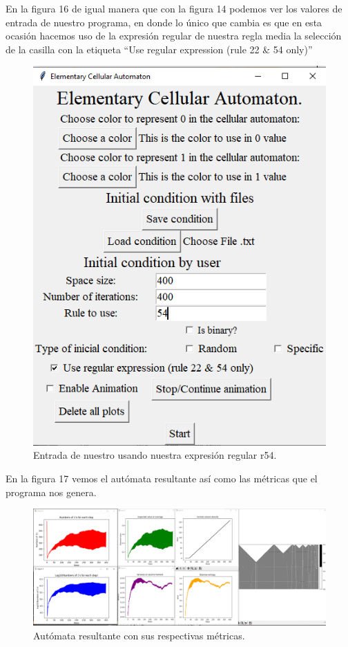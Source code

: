 \documentclass[11pt]{article}
\begin{document}
		En la figura 16 de igual manera que con la figura 14 podemos ver los valores de entrada de nuestro programa, en donde lo único que cambia es que en esta ocasión hacemos uso de la expresión regular de nuestra regla media la selección de la casilla con la etiqueta ``Use regular expression (rule 22 \& 54 only)''
		\begin{figure}[H]
			\centering
			\includegraphics[scale=0.5]{resources/RegEx54/50_prob_regex_entrada.png}
			\caption{Entrada de nuestro usando nuestra expresión regular r54.}\label{fig:picture}
		\end{figure}
		En la figura 17 vemos el autómata resultante así como las métricas que el programa nos genera.
		\begin{figure}[H]
			\includegraphics[scale=0.26]{resources/RegEx54/50_prob_regex_result.png}
			\caption{Autómata resultante con sus respectivas métricas.}\label{fig:picture}
		\end{figure}
\end{document}
